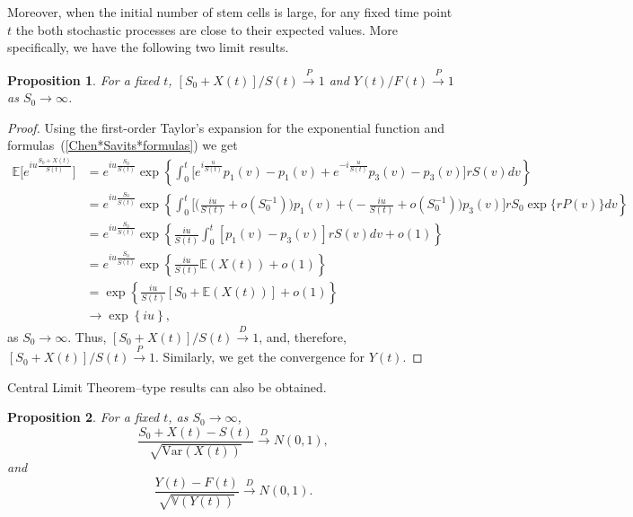 \documentclass[10pt]{article}
\newtheorem{proposition}{Proposition}
\newcommand{\Var}{\mathbb{V}}
\newcommand{\EE}{\mathbb{E}}
\begin{document}
Moreover, when the initial number of stem cells is large, for any fixed time point $t$ the both stochastic processes are close 
to their expected values. More specifically, we have the following two limit results.     
\begin{proposition}
For a fixed $t$, $[S_0+X(t)]/S(t)  \overset{P}{\longrightarrow} 1$ and $Y(t)/F(t) \overset{P}{\longrightarrow} 1$ as $S_0 \rightarrow \infty$.
\end{proposition}
\begin{proof}
Using the first-order Taylor's expansion for the exponential function and formulas~(\ref{Chen*Savits*formulas}) we get
\begin{equation*}
\begin{split}
\EE\Big[e^{iu \frac{S_0+X(t)}{S(t)}}\Big] & =e^{iu \frac{S_0}{S(t)}} \exp \left\{  \int_0^t \Big[ e^{i \frac{u}{S(t)}}p_1(v) - p_1(v) + e^{-i \frac{u}{S(t)}}p_3(v) - p_3(v)\Big] r S(v) dv\right\} \\
& = e^{iu \frac{S_0}{S(t)}}\exp \left\{ \int_0^t \Big[ \Big(\frac{iu}{S(t)}  + o\left(S_0^{-1}\right) \Big) p_1(v) + \Big( - \frac{iu}{S(t)}  + o\left(S_0^{-1}\right) \Big) p_3(v)  \Big] r S_0\exp\{r P(v)\} dv\right\} \\
& = e^{iu \frac{S_0}{S(t)}}\exp \left\{ \frac{iu}{S(t)} \int_0^t  [p_1(v) - p_3(v)] r S(v) dv  + o(1)\right\}\\       %
& = e^{iu \frac{S_0}{S(t)}}\exp \left\{ \frac{iu}{S(t)} \EE(X(t))  +  o (1)\right\}\\                                  %
& = \exp \left\{ \frac{iu}{S(t)} [S_0+\EE(X(t))]  +  o (1)\right\} \\                                                  %
& \rightarrow \exp \left\{iu\right\},
\end{split}
\end{equation*}
as $S_0\to\infty.$
Thus, $[S_0+X(t)]/S(t)  \overset{D}{\longrightarrow} 1$, and, therefore, $[S_0+X(t)]/S(t)  \overset{P}{\longrightarrow} 1$. Similarly, we get the convergence for $Y(t)$.
\end{proof}
Central Limit Theorem–type results can also be obtained. 
\begin{proposition}
For a fixed $t$, as $S_0 \rightarrow \infty$,
\begin{equation*}
\frac{S_0+X(t) - S(t)}{\sqrt{\text{Var}(X(t))}} \overset{D}{\longrightarrow} N(0, 1),
\end{equation*}
and
\begin{equation*}
\frac{Y(t) - F(t)}{\sqrt{\Var(Y(t))}} \overset{D}{\longrightarrow} N(0, 1).
\end{equation*}
\end{proposition}
\end{document}
